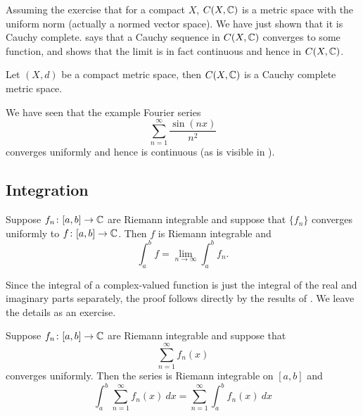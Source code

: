 Assuming the exercise that for a compact $X$, $C(X,{\mathbb{C}})$ is a metric space with
the uniform norm (actually a normed vector space).  We have just shown that
it is Cauchy complete.   says that a Cauchy
sequence in $C(X,{\mathbb{C}})$ converges to some function,
and  shows that the limit is in fact
continuous and hence in $C(X,{\mathbb{C}})$.

\begin{cor}
Let $(X,d)$ be a compact metric space, then $C(X,{\mathbb{C}})$ is a Cauchy
complete metric space.
\end{cor}

\begin{example}
We have seen that the example Fourier series 
\begin{equation*}
\sum_{n=1}^\infty \frac{\sin(nx)}{n^2}
\end{equation*}
converges uniformly and hence is continuous (as is visible
in ).
\end{example}

\subsection{Integration}

\begin{prop} \label{prop:complexlimitswapintegral}
Suppose $f_n \colon [a,b] \to {\mathbb{C}}$
are Riemann integrable and suppose that $\{ f_n \}$ converges
uniformly to $f \colon [a,b] \to {\mathbb{C}}$.  Then $f$ is Riemann integrable
and
\begin{equation*}
\int_a^b f = \lim_{n\to \infty} \int_a^b f_n .
\end{equation*}
\end{prop}

Since the integral of a complex-valued function is just the integral of
the real and imaginary parts separately,
the proof follows directly by the results of
.
We leave the details as an exercise.

\begin{cor}
Suppose $f_n \colon [a,b] \to {\mathbb{C}}$
are Riemann integrable and suppose that
\begin{equation*}
\sum_{n=1}^\infty f_n(x)
\end{equation*}
converges uniformly.  Then the series is Riemann integrable on $[a,b]$
and
\begin{equation*}
\int_a^b \sum_{n=1}^\infty f_n(x) ~dx
=
\sum_{n=1}^\infty \int_a^b f_n(x) ~dx
\end{equation*}
\end{cor}

